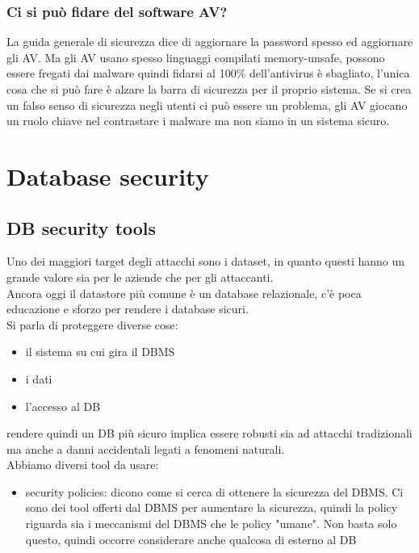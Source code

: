 \documentclass[12pt, oneside]{extbook} %
\begin{document}
\subsection{Ci si può fidare del software AV?}
La guida generale di sicurezza dice di aggiornare la password spesso ed aggiornare gli AV. Ma gli AV usano spesso linguaggi compilati memory-unsafe, possono essere fregati dai malware quindi fidarsi al 100\% dell'antivirus è sbagliato, l'unica cosa che si può fare è alzare la barra di sicurezza per il proprio sistema. Se si crea un falso senso di sicurezza negli utenti ci può essere un problema, gli AV giocano un ruolo chiave nel contrastare i malware ma non siamo in un sistema sicuro.
\chapter{Database security}
\section{DB security tools}
Uno dei maggiori target degli attacchi sono i dataset, in quanto questi hanno un grande valore sia per le aziende che per gli attaccanti.\\Ancora oggi il datastore più comune è un database relazionale, c'è poca educazione e sforzo per rendere i database sicuri.\\Si parla di proteggere diverse cose:
\begin{itemize}
	\item il sistema su cui gira il DBMS
	\item i dati
	\item l'accesso al DB
\end{itemize}
rendere quindi un DB più sicuro implica essere robusti sia ad attacchi tradizionali ma anche a danni accidentali legati a fenomeni naturali.\\Abbiamo diversi tool da usare:
\begin{itemize}
	\item security policies: dicono come si cerca di ottenere la sicurezza del DBMS. Ci sono dei tool offerti dal DBMS per aumentare la sicurezza, quindi la policy riguarda sia i meccanismi del DBMS che le policy "umane". Non basta solo questo, quindi occorre considerare anche qualcosa di esterno al DB
\end{itemize}
\end{document}
